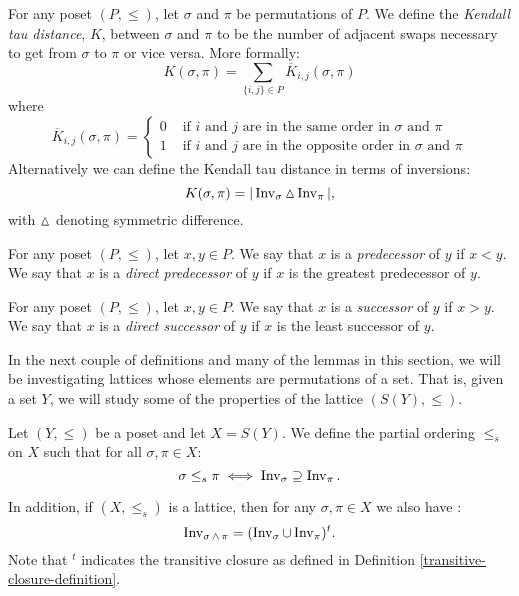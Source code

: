 	\begin{definition}
		\label{kendall-tau-definition}
		For any poset $(P, \le)$, let $\sigma$ and $\pi$ be permutations of $P$. We define the \emph{Kendall tau distance}, $K$, between $\sigma$ and $\pi$ to be the number of adjacent swaps necessary to get from $\sigma$ to $\pi$ or vice versa. More formally:
		\[
			K(\sigma, \pi) = \sum_{\{i, j\} \in P} \overline{K}_{i, j}(\sigma, \pi)
		\]
		where
		\[
			\overline{K}_{i,j}(\sigma, \pi) =
				\begin{cases}
					0 & \textrm{ if } i \textrm{ and } j \textrm{ are in the same order in } \sigma \textrm{ and } \pi \\
					1 & \textrm{ if } i \textrm{ and } j \textrm{ are in the opposite order in } \sigma \textrm{ and } \pi
				\end{cases}
		\]
		Alternatively we can define the Kendall tau distance in terms of inversions:
		\[
			K(\sigma, \pi) = |\operatorname{Inv}_{\sigma} \operatorname{\vartriangle} \operatorname{Inv}_{\pi}|,
		\]
		with $\operatorname{\vartriangle}$ denoting symmetric difference.
	\end{definition}

	\begin{definition}
		For any poset $(P, \le)$, let $x,y \in P$. We say that $x$ is a \emph{predecessor} of $y$ if $x < y$. We say that $x$ is a \emph{direct predecessor} of $y$ if $x$ is the greatest predecessor of $y$.
	\end{definition}

	\begin{definition}
		For any poset $(P, \le)$, let $x,y \in P$. We say that $x$ is a \emph{successor} of $y$ if $x > y$. We say that $x$ is a \emph{direct successor} of $y$ if $x$ is the least successor of $y$.
	\end{definition}

	In the next couple of definitions and many of the lemmas in this section, we will be investigating lattices whose elements are permutations of a set. That is, given a set $Y$, we will study some of the properties of the lattice $(S(Y), \le)$.

	\begin{definition}[$\le_s$]
		\label{partial-order-s-definition}
		Let $(Y, \le)$ be a poset and let $X = S(Y)$. We define the partial ordering $\le_s$ on $X$ such that for all $\sigma, \pi \in X$:
		\[
			\sigma \le_s \pi \iff \operatorname{Inv}_{\sigma} \supseteq \operatorname{Inv}_{\pi}.
		\]

		In addition, if $(X, \le_s)$ is a lattice, then for any $\sigma, \pi \in X$ we also have \cite{markowsky1994permutation}:
		\[
			\operatorname{Inv}_{\sigma \operatorname{\wedge} \pi} = (\operatorname{Inv}_{\sigma} \cup \operatorname{Inv}_{\pi})^t.
		\]
		Note that $^t$ indicates the transitive closure as defined in Definition \ref{transitive-closure-definition}.
	\end{definition}

